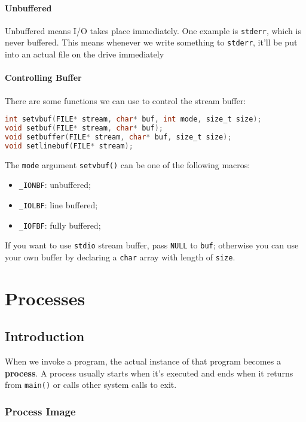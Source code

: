 \documentclass{article}
\newcommand{\bold}[1]{\textbf{#1}}
\renewcommand{\b}{\item[$\circ$]}
\newcommand{\newlist}{\begin{itemize}}
\renewcommand{\endlist}{\end{itemize}}
\newcommand{\code}[1]{\texttt{#1}}
\begin{document}
\paragraph{Unbuffered}

Unbuffered means I/O takes place immediately. One example is \code{stderr}, which is never buffered. This means whenever we write something to \code{stderr}, it'll be put into an actual file on the drive immediately 

\paragraph{Controlling Buffer}

There are some functions we can use to control the stream buffer:

\begin{lstlisting}[language=C]
int setvbuf(FILE* stream, char* buf, int mode, size_t size);
void setbuf(FILE* stream, char* buf);
void setbuffer(FILE* stream, char* buf, size_t size);
void setlinebuf(FILE* stream);
\end{lstlisting}

The \code{mode} argument \code{setvbuf()} can be one of the following macros:

\newlist
\b \code{\_IONBF}: unbuffered;
\b \code{\_IOLBF}: line buffered;
\b \code{\_IOFBF}: fully buffered;
\endlist

If you want to use \code{stdio} stream buffer, pass \code{NULL} to \code{buf}; otherwise you can use your own buffer by declaring a \code{char} array with length of \code{size}.

\newpage
\section{Processes}

\subsection{Introduction}

When we invoke a program, the actual instance of that program becomes a \bold{process}. A process usually starts when it's executed and ends when it returns from \code{main()} or calls other system calls to exit.

\subsubsection{Process Image}
\end{document}
